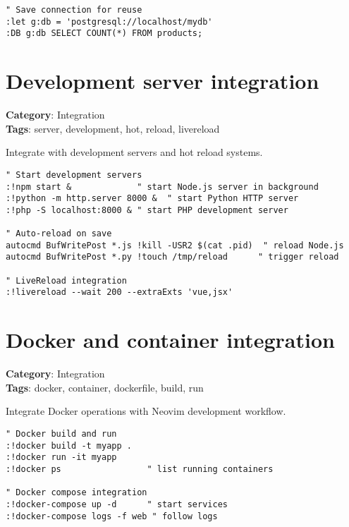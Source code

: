 {{{{{{\begin{Exa*}{}
\begin{Verbatim}[fontsize=\footnotesize, breaklines, breakanywhere]
" Save connection for reuse
:let g:db = 'postgresql://localhost/mydb'
:DB g:db SELECT COUNT(*) FROM products;
\end{Verbatim}
\end{Exa*}

\section{Development server integration}

\textbf{Category}: Integration\\ \textbf{Tags}: server, development, hot, reload, livereload
\vspace{0.5cm}

Integrate with development servers and hot reload systems.

\begin{Exa*}{}
\begin{Verbatim}[fontsize=\footnotesize, breaklines, breakanywhere]
" Start development servers
:!npm start &             " start Node.js server in background
:!python -m http.server 8000 &  " start Python HTTP server
:!php -S localhost:8000 & " start PHP development server

" Auto-reload on save
autocmd BufWritePost *.js !kill -USR2 $(cat .pid)  " reload Node.js
autocmd BufWritePost *.py !touch /tmp/reload      " trigger reload

" LiveReload integration
:!livereload --wait 200 --extraExts 'vue,jsx'
\end{Verbatim}
\end{Exa*}

\section{Docker and container integration}

\textbf{Category}: Integration\\ \textbf{Tags}: docker, container, dockerfile, build, run
\vspace{0.5cm}

Integrate Docker operations with Neovim development workflow.

\begin{Exa*}{}
\begin{Verbatim}[fontsize=\footnotesize, breaklines, breakanywhere]
" Docker build and run
:!docker build -t myapp .
:!docker run -it myapp
:!docker ps                 " list running containers

" Docker compose integration
:!docker-compose up -d      " start services
:!docker-compose logs -f web " follow logs


\end{Verbatim}
\end{Exa*}}}}}}}

